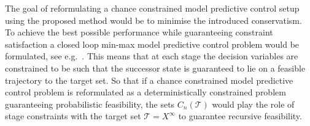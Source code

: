 \documentclass{ifacconf}
\providecommand{\T}{\mathcal T}
\begin{document}
\begin{rem}
The goal of reformulating a chance constrained model predictive control setup using the proposed method would be to minimise the introduced conservatism.
%
To achieve the best possible performance while guaranteeing constraint satisfaction a closed loop min-max model predictive control problem would be formulated, see e.g.~\cite{Lee:1997}.
%
This means that at each stage the decision variables are constrained to be such that the successor state is guaranteed to lie on a feasible trajectory to the target set.
%
So that if a chance constrained model predictive control problem is reformulated as a deterministically constrained problem guaranteeing probabilistic feasibility, the sets $C_n(\T)$ would play the role of stage constraints with the target set $\T=X^\infty$ to guarantee recursive feasibility.
\end{rem}
\end{document}
